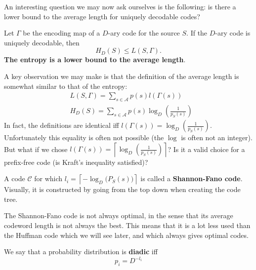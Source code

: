\documentclass{report}
\begin{document}
An interesting question we may now ask ourselves is the following: is there a lower bound to the average length for uniquely decodable codes?

\begin{thm}
	Let $\Gamma$ be the encoding map of a $D$-ary code for the source $S$. If the $D$-ary code is uniquely decodable, then
	\begin{equation}
		H_D(S) \leq L(S, \Gamma).
	\end{equation}
	\textbf{The entropy is a lower bound to the average length}.
\end{thm}

\begin{remark}
	A key observation we may make is that the definition of the average length is somewhat similar to that of the entropy:
	\begin{align*}
		&L(S, \Gamma) = \sum_{s \in \mathcal A} p(s) l(\Gamma(s)) \\
		&H_D(S) = \sum_{s \in \mathcal A} p(s) \log_D \left(\frac{1}{p_S(s)}\right)
	\end{align*}
In fact, the definitions are identical iff $l(\Gamma(s)) = \log_D \left(\frac{1}{p_S(s)}\right)$. Unfortunately this equality is often not possible (the $\log$ is often not an integer). But what if we chose $l(\Gamma(s)) = \left\lceil \log_D \left(\frac{1}{p_S(s)}\right) \right\rceil$? Is it a valid choice for a prefix-free code (is Kraft's inequality satisfied)?
\end{remark}

\begin{defn}
	A code $\mathcal C$ for which $l_i = \left\lceil -\log_D \bigl(P_S(s) \bigr) \right\rceil$ is called a \textbf{Shannon-Fano code}. Visually, it is constructed by going from the top down when creating the code tree.
\end{defn}
\begin{remark}
	The Shannon-Fano code is not always optimal, in the sense that its average codeword length is not always the best. This means that it is a lot less used than the Huffman code which we will see later, and which always gives optimal codes.
\end{remark}


\begin{defn}
	We say that a probability distribution is \textbf{diadic} iff
	\begin{equation}
		p_i = D^{-l_i}
	\end{equation}
\end{defn}
\end{document}
